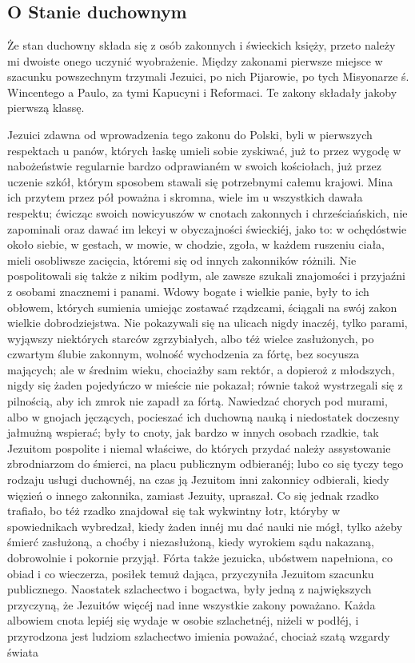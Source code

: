 \documentclass{book}
\begin{document}
\chapter{}

\section{O Stanie duchownym}

Że stan duchowny składa się z osób zakonnych i świeckich księży, przeto należy mi dwoiste onego uczynić wyobrażenie. Między zakonami pierwsze miejsce w szacunku powszechnym trzymali Jezuici, po nich Pijarowie, po tych Misyonarze ś. Wincentego a Paulo, za tymi Kapucyni i Reformaci. Te zakony składały jakoby pierwszą klassę.

Jezuici zdawna od wprowadzenia tego zakonu do Polski, byli w pierwszych respektach u panów, których łaskę umieli sobie zyskiwać, już to przez wygodę w nabożeństwie regularnie bardzo odprawianém w swoich kościołach, już przez uczenie szkół, którym sposobem stawali się potrzebnymi całemu krajowi. Mina ich przytem przez pół poważna i skromna, wiele im u wszystkich dawała respektu; ćwicząc swoich nowicyuszów w cnotach zakonnych i chrześciańskich, nie zapominali oraz dawać im lekcyi w obyczajności świeckiéj, jako to: w ochędóstwie około siebie, w gestach, w mowie, w chodzie, zgoła, w każdem ruszeniu ciała, mieli osobliwsze zacięcia, któremi się od innych zakonników różnili. Nie pospolitowali się także z nikim podłym, ale zawsze szukali znajomości i przyjaźni z osobami znacznemi i panami. Wdowy bogate i wielkie panie, były to ich obłowem, których sumienia umiejąc zostawać rządzcami, ściągali na swój zakon wielkie dobrodziejstwa. Nie pokazywali się na ulicach nigdy inaczéj, tylko parami, wyjąwszy niektórych starców zgrzybiałych, albo téż wielce zasłużonych, po czwartym ślubie zakonnym, wolność wychodzenia za fórtę, bez socyusza mających; ale w średnim wieku, chociażby sam rektór, a dopieroż z młodszych, nigdy się żaden pojedyńczo w mieście nie pokazał; równie takoż wystrzegali się z pilnością, aby ich zmrok nie zapadł za fórtą. Nawiedzać chorych pod murami, albo w gnojach jęczących, pocieszać ich duchowną nauką i niedostatek doczesny jałmużną wspierać; były to cnoty, jak bardzo w innych osobach rzadkie, tak Jezuitom pospolite i niemal właściwe, do których przydać należy assystowanie zbrodniarzom do śmierci, na placu publicznym odbieranéj; lubo co się tyczy tego rodzaju usługi duchownéj, na czas ją Jezuitom inni zakonnicy odbierali, kiedy więzień o innego zakonnika, zamiast Jezuity, upraszał. Co się jednak rzadko trafiało, bo téż rzadko znajdował się tak wykwintny łotr, któryby w spowiednikach wybredzał, kiedy żaden innéj mu dać nauki nie mógł, tylko ażeby śmierć zasłużoną, a choćby i niezasłużoną, kiedy wyrokiem sądu nakazaną, dobrowolnie i pokornie przyjął. Fórta także jezuicka, ubóstwem napełniona, co obiad i co wieczerza, posiłek temuż dająca, przyczyniła Jezuitom szacunku publicznego. Naostatek szlachectwo i bogactwa, były jedną z największych przyczyną, że Jezuitów więcéj nad inne wszystkie zakony poważano. Każda albowiem cnota lepiéj się wydaje w osobie szlachetnéj, niżeli w podłéj, i przyrodzona jest ludziom szlachectwo imienia poważać, chociaż szatą wzgardy świata 
\end{document}
